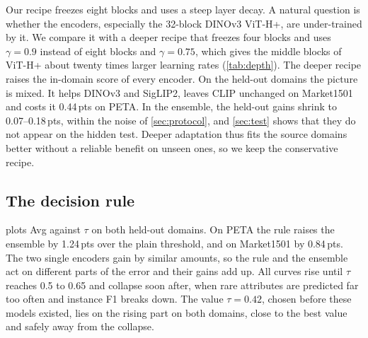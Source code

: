 \documentclass[10pt,twocolumn,letterpaper]{article}
\newcommand{\pts}{\,pts}
\begin{document}
Our recipe freezes eight blocks and uses a steep layer decay. A natural question is whether the encoders, especially the 32-block DINOv3 ViT-H+, are under-trained by it. We compare it with a deeper recipe that freezes four blocks and uses $\gamma=0.9$ instead of eight blocks and $\gamma=0.75$, which gives the middle blocks of ViT-H+ about twenty times larger learning rates (\cref{tab:depth}). The deeper recipe raises the in-domain score of every encoder. On the held-out domains the picture is mixed. It helps DINOv3 and SigLIP2, leaves CLIP unchanged on Market1501 and costs it 0.44\pts{} on PETA. In the ensemble, the held-out gains shrink to 0.07--0.18\pts, within the noise of \cref{sec:protocol}, and \cref{sec:test} shows that they do not appear on the hidden test. Deeper adaptation thus fits the source domains better without a reliable benefit on unseen ones, so we keep the conservative recipe.

\begin{table}[t]
\centering\small
\setlength{\tabcolsep}{3.2pt}
\caption{Conservative recipe $\rightarrow$ deeper recipe, single encoders and the ensemble.}
\label{tab:depth}
\end{table}

\subsection{The decision rule}
\label{sec:rule_exp}

 plots Avg against $\tau$ on both held-out domains. On PETA the rule raises the ensemble by 1.24\pts{} over the plain threshold, and on Market1501 by 0.84\pts. The two single encoders gain by similar amounts, so the rule and the ensemble act on different parts of the error and their gains add up. All curves rise until $\tau$ reaches 0.5 to 0.65 and collapse soon after, when rare attributes are predicted far too often and instance F1 breaks down. The value $\tau=0.42$, chosen before these models existed, lies on the rising part on both domains, close to the best value and safely away from the collapse.
\end{document}
